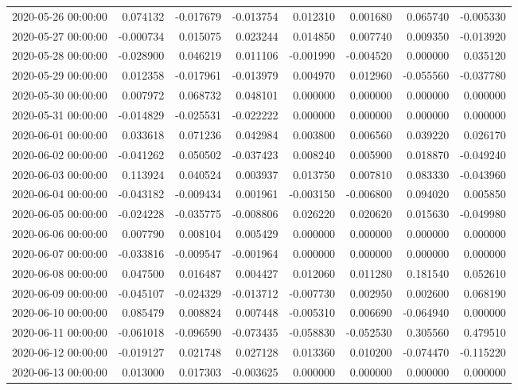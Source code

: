 \begin{tabular}{lrrrrrrr}
2020-05-26 00:00:00 & 0.074132 & -0.017679 & -0.013754 & 0.012310 & 0.001680 & 0.065740 & -0.005330 \\
2020-05-27 00:00:00 & -0.000734 & 0.015075 & 0.023244 & 0.014850 & 0.007740 & 0.009350 & -0.013920 \\
2020-05-28 00:00:00 & -0.028900 & 0.046219 & 0.011106 & -0.001990 & -0.004520 & 0.000000 & 0.035120 \\
2020-05-29 00:00:00 & 0.012358 & -0.017961 & -0.013979 & 0.004970 & 0.012960 & -0.055560 & -0.037780 \\
2020-05-30 00:00:00 & 0.007972 & 0.068732 & 0.048101 & 0.000000 & 0.000000 & 0.000000 & 0.000000 \\
2020-05-31 00:00:00 & -0.014829 & -0.025531 & -0.022222 & 0.000000 & 0.000000 & 0.000000 & 0.000000 \\
2020-06-01 00:00:00 & 0.033618 & 0.071236 & 0.042984 & 0.003800 & 0.006560 & 0.039220 & 0.026170 \\
2020-06-02 00:00:00 & -0.041262 & 0.050502 & -0.037423 & 0.008240 & 0.005900 & 0.018870 & -0.049240 \\
2020-06-03 00:00:00 & 0.113924 & 0.040524 & 0.003937 & 0.013750 & 0.007810 & 0.083330 & -0.043960 \\
2020-06-04 00:00:00 & -0.043182 & -0.009434 & 0.001961 & -0.003150 & -0.006800 & 0.094020 & 0.005850 \\
2020-06-05 00:00:00 & -0.024228 & -0.035775 & -0.008806 & 0.026220 & 0.020620 & 0.015630 & -0.049980 \\
2020-06-06 00:00:00 & 0.007790 & 0.008104 & 0.005429 & 0.000000 & 0.000000 & 0.000000 & 0.000000 \\
2020-06-07 00:00:00 & -0.033816 & -0.009547 & -0.001964 & 0.000000 & 0.000000 & 0.000000 & 0.000000 \\
2020-06-08 00:00:00 & 0.047500 & 0.016487 & 0.004427 & 0.012060 & 0.011280 & 0.181540 & 0.052610 \\
2020-06-09 00:00:00 & -0.045107 & -0.024329 & -0.013712 & -0.007730 & 0.002950 & 0.002600 & 0.068190 \\
2020-06-10 00:00:00 & 0.085479 & 0.008824 & 0.007448 & -0.005310 & 0.006690 & -0.064940 & 0.000000 \\
2020-06-11 00:00:00 & -0.061018 & -0.096590 & -0.073435 & -0.058830 & -0.052530 & 0.305560 & 0.479510 \\
2020-06-12 00:00:00 & -0.019127 & 0.021748 & 0.027128 & 0.013360 & 0.010200 & -0.074470 & -0.115220 \\
2020-06-13 00:00:00 & 0.013000 & 0.017303 & -0.003625 & 0.000000 & 0.000000 & 0.000000 & 0.000000 \\

\end{tabular}

